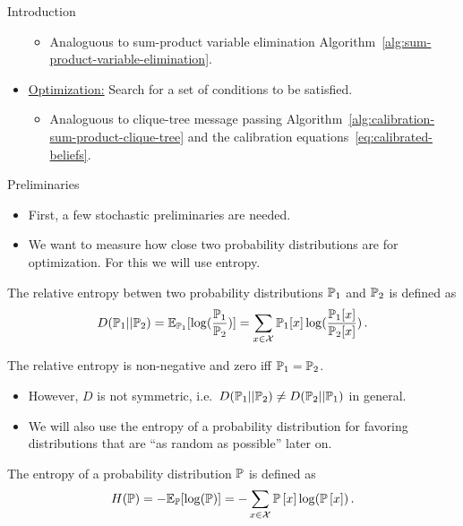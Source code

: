 \begin{frame}{Introduction}
\begin{itemize}
\begin{itemize}
\pause \item Analoguous to sum-product variable elimination Algorithm~\ref{alg:sum-product-variable-elimination}.
\end{itemize}
\pause \item \underline{Optimization:} Search for a set of conditions to be satisfied.
\begin{itemize}
\pause \item Analoguous to clique-tree message passing Algorithm~\ref{alg:calibration-sum-product-clique-tree} and the calibration equations~\eqref{eq:calibrated-beliefs}.
\end{itemize}
\end{itemize}
\end{frame}

\begin{frame}{Preliminaries}
    \begin{itemize}
    \item First, a few stochastic preliminaries are needed.
    \item We want to measure how close two probability distributions are for optimization. For this we will use entropy.
    \end{itemize}
    \pause
    \begin{definition}
        The relative entropy betwen two probability distributions $\Pb_1$ and $\Pb_2$ is defined as
        \begin{equation}
            D(\Pb_1 || \Pb_2) = \E_{\Pb_1}[\log(\frac{\Pb_1}{\Pb_2})] = \sum_{x \in \mathcal{X}} \Pb_1[x] \log( \frac{\Pb_1[x]}{\Pb_2[x]})\,.
        \end{equation}
    \end{definition}
    \pause
    \begin{proposition}
       The relative entropy is non-negative and zero iff $\Pb_1 = \Pb_2$. 
    \end{proposition}
    \pause
    \begin{itemize}
        \item However, $D$ is not symmetric, i.e.\ $D(\Pb_1 || \Pb_2) \neq D(\Pb_2 || \Pb_1)$ in general.
    \end{itemize}
    \pause
    \begin{itemize}
        \item We will also use the entropy of a probability distribution for favoring distributions that are ``as random as possible'' later on.
    \end{itemize}
    \pause
    \begin{definition}[Entropy]
        The entropy of a probability distribution $\Pb$ is defined as
        \begin{equation}
            H(\Pb) = -\E_{\Pb}[\log(\Pb)] = -\sum_{x \in \mathcal{X}} \Pb[x] \log(\Pb[x])\,.
        \end{equation}
    \end{definition}
\end{frame}

